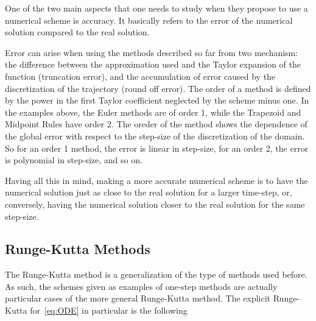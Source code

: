 \documentclass[12pt, class=report, crop=false]{standalone}
\begin{document}
One of the two main aspects that one needs to study when they propose to use a numerical scheme is accuracy. It basically refers to the error of the numerical solution compared to the real solution.

Error can arise when using the methods described so far from two mechanism: the difference between the approximation used and the Taylor expansion of the function (truncation error), and the accumulation of error caused by the discretization of the trajectory (round off error). The order of a method is defined by the power in the first Taylor coefficient neglected by the scheme minus one. In the examples above, the Euler methods are of order 1, while the Trapezoid and Midpoint Rules have order 2. The oreder of the method shows the dependence of the global error with respect to the step-size of the discretization of the domain. So for an order 1 method, the error is linear in step-size, for an order 2, the error is polynomial in step-size, and so on.

Having all this in mind, making a more accurate numerical scheme is to have the numerical solution just as close to the real solution for a larger time-step, or, conversely, having the numerical solution closer to the real solution for the same step-size.

\subsection{Runge-Kutta Methods}

The Runge-Kutta method is a generalization of the type of methods used before. As such, the schemes given as examples of one-step methods are actually particular cases of the more general Runge-Kutta method. The explicit Runge-Kutta for~\cref{eq:ODE} in particular is the following
\end{document}
